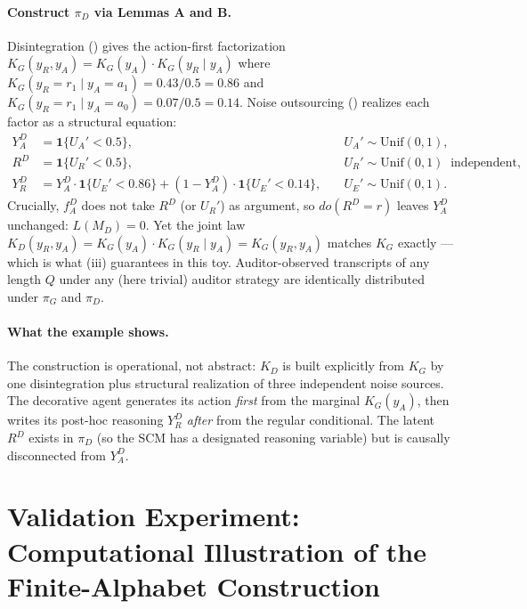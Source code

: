 \documentclass{article}
\theoremstyle{plain}
\theoremstyle{definition}
\theoremstyle{remark}
\begin{document}
\paragraph{Construct $\pi_D$ via Lemmas A and B.}
Disintegration () gives the action-first factorization
$K_G(y_R, y_A) = K_G(y_A) \cdot K_G(y_R \mid y_A)$ where
$K_G(y_R = r_1 \mid y_A = a_1) = 0.43 / 0.5 = 0.86$ and
$K_G(y_R = r_1 \mid y_A = a_0) = 0.07 / 0.5 = 0.14$.
Noise outsourcing () realizes each factor as a structural
equation:
\begin{align*}
Y_A^D &= \mathbf{1}\{U_A' < 0.5\}, &\quad U_A' \sim \mathrm{Unif}(0,1), \\
R^D   &= \mathbf{1}\{U_R' < 0.5\}, &\quad U_R' \sim \mathrm{Unif}(0,1) \;\;\text{independent}, \\
Y_R^D &= Y_A^D \cdot \mathbf{1}\{U_E' < 0.86\} + (1 - Y_A^D) \cdot \mathbf{1}\{U_E' < 0.14\},
&\quad U_E' \sim \mathrm{Unif}(0,1).
\end{align*}
Crucially, $f_A^D$ does not take $R^D$ (or $U_R'$) as argument, so
$do(R^D = r)$ leaves $Y_A^D$ unchanged: $L(M_D) = 0$. Yet the joint law
$K_D(y_R, y_A) = K_G(y_A) \cdot K_G(y_R \mid y_A) = K_G(y_R, y_A)$
matches $K_G$ exactly --- which is what (iii)
guarantees in this toy. Auditor-observed transcripts of any length $Q$
under any (here trivial) auditor strategy are identically distributed under
$\pi_G$ and $\pi_D$.

\paragraph{What the example shows.}
The construction is operational, not abstract: $K_D$ is built explicitly
from $K_G$ by one disintegration plus structural realization of three
independent noise sources. The decorative agent generates its action
\emph{first} from the marginal $K_G(y_A)$, then writes its post-hoc
reasoning $Y_R^D$ \emph{after} from the regular conditional. The latent
$R^D$ exists in $\pi_D$ (so the SCM has a designated reasoning variable)
but is causally disconnected from $Y_A^D$.

\section{Validation Experiment: Computational Illustration of the Finite-Alphabet Construction}\label{app:validation}
\end{document}
